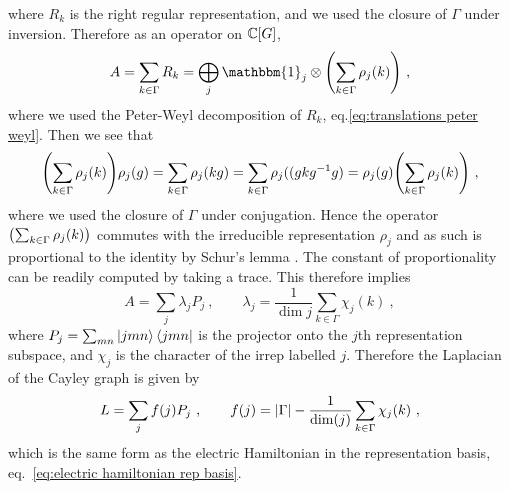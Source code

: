 where $R_k$ is the right regular representation, and we used the closure of $\Gamma$ under inversion.
Therefore as an operator on $\mathbb{C}[G]$,
\begin{equation}
    A = \sum_{k \in \Gamma} R_k = \bigoplus_j \mathbbm{1}_j \otimes \pqty{\sum_{k \in \Gamma} \rho_j(k)} \ ,
\end{equation}
where we used the Peter-Weyl decomposition of $R_k$, eq.\eqref{eq:translations peter weyl}.
Then we see that
\begin{equation}
    \pqty{\sum_{k \in \Gamma} \rho_j(k)} \rho_j(g) = \sum_{k \in \Gamma} \rho_j(kg) = \sum_{k \in \Gamma} \rho_j((g k g^{-1} g) = \rho_j(g) \pqty{\sum_{k \in \Gamma} \rho_j(k)} \ ,
\end{equation}
where we used the closure of $\Gamma$ under conjugation.
Hence the operator $\pqty{\sum_{k \in \Gamma} \rho_j(k)}$ commutes with the irreducible representation $\rho_j$ and as such is proportional to the identity by Schur's lemma \cite{Serre}.
The constant of proportionality can be readily computed by taking a trace.
This therefore implies
\begin{equation}
    A = \sum_j \lambda_j P_j \ , \quad \quad \lambda_j = \frac{1}{\dim{j}} \sum_{k \in \Gamma} \chi_j(k) \ ,
\end{equation}
where $P_j = \sum_{mn} \ket{jmn}\bra{jmn}$ is the projector onto the $j$th representation subspace, and $\chi_j$ is the character of the irrep labelled $j$.
Therefore the Laplacian of the Cayley graph is given by
\begin{equation}\label{eq:laplacian finite group}
    L = \sum_j f(j) P_j \ , \quad \quad f(j)= \abs{\Gamma}-\frac{1}{\mathrm{dim}(j)} \sum_{k \in \Gamma} \chi_j(k) \ ,
\end{equation}
which is the same form as the electric Hamiltonian in the representation basis, eq.~\eqref{eq:electric hamiltonian rep basis}.

